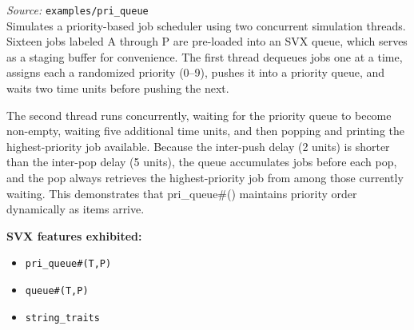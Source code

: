\documentclass[11pt,letterpaper]{report}
\begin{document}
\textit{Source:} \texttt{examples/pri\_queue}\\

Simulates a priority-based job scheduler using two concurrent simulation threads. Sixteen jobs labeled A through P are pre-loaded into an SVX queue, which serves as a staging buffer for convenience. The first thread dequeues jobs one at a time, assigns each a randomized priority (0--9), pushes it into a priority queue, and waits two time units before pushing the next.

The second thread runs concurrently, waiting for the priority queue to become non-empty, waiting five additional time units, and then popping and printing the highest-priority job available. Because the inter-push delay (2 units) is shorter than the inter-pop delay (5 units), the queue accumulates jobs before each pop, and the pop always retrieves the highest-priority job from among those currently waiting. This demonstrates that pri\_queue\#() maintains priority order dynamically as items arrive.

\textbf{SVX features exhibited:}

\begin{itemize}
  \item \texttt{pri\_queue\#(T,P)}
  \item \texttt{queue\#(T,P)}
  \item \texttt{string\_traits}
\end{itemize}
\end{document}
